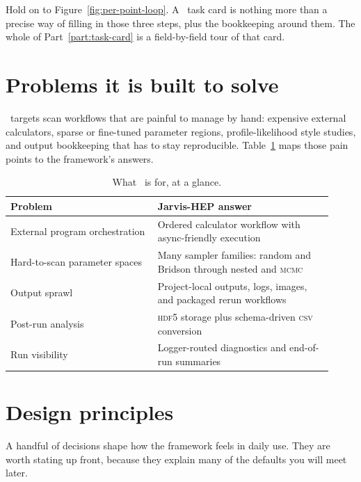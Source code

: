 Hold on to Figure~\ref{fig:per-point-loop}. A \Jarvis\ task card is nothing more than a
precise way of filling in those three steps, plus the bookkeeping around them. The whole of
Part~\ref{part:task-card} is a field-by-field tour of that card.

\section{Problems it is built to solve}
\label{sec:problems}

\Jarvis\ targets scan workflows that are painful to manage by hand: expensive external
calculators, sparse or fine-tuned parameter regions, profile-likelihood style studies, and
output bookkeeping that has to stay reproducible. Table~\ref{tab:at-a-glance} maps those pain
points to the framework's answers.

\begin{table}[ht]
  \footnotesize
  \begin{tabular}{@{}p{0.42\linewidth}p{0.5\linewidth}@{}}
    \toprule
    \textbf{Problem} & \textbf{Jarvis-HEP answer} \\
    \midrule
    External program orchestration & Ordered calculator workflow with async-friendly execution \\
    Hard-to-scan parameter spaces & Many sampler families: random and Bridson through nested and \textsc{mcmc} \\
    Output sprawl & Project-local outputs, logs, images, and packaged rerun workflows \\
    Post-run analysis & \textsc{hdf5} storage plus schema-driven \textsc{csv} conversion \\
    Run visibility & Logger-routed diagnostics and end-of-run summaries \\
    \bottomrule
  \end{tabular}
  \caption{What \Jarvis\ is for, at a glance.}
  \label{tab:at-a-glance}
\end{table}

\section{Design principles}
\label{sec:principles}

A handful of decisions shape how the framework feels in daily use. They are worth stating up
front, because they explain many of the defaults you will meet later.

